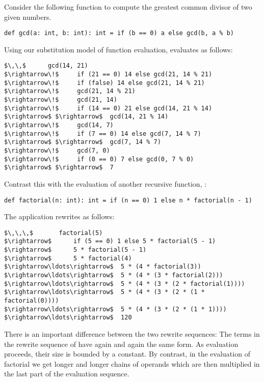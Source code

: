 Consider the following function to compute the greatest common divisor
of two given numbers.

\begin{lstlisting}
def gcd(a: int, b: int): int = if (b == 0) a else gcd(b, a % b)
\end{lstlisting}

Using our substitution model of function evaluation, 
 evaluates as follows:

\begin{lstlisting}
$\,\,$      gcd(14, 21)  
$\rightarrow\!$     if (21 == 0) 14 else gcd(21, 14 % 21)
$\rightarrow\!$     if (false) 14 else gcd(21, 14 % 21)
$\rightarrow\!$     gcd(21, 14 % 21)
$\rightarrow\!$     gcd(21, 14)
$\rightarrow\!$     if (14 == 0) 21 else gcd(14, 21 % 14)
$\rightarrow$ $\rightarrow$  gcd(14, 21 % 14)
$\rightarrow\!$     gcd(14, 7)
$\rightarrow\!$     if (7 == 0) 14 else gcd(7, 14 % 7)
$\rightarrow$ $\rightarrow$  gcd(7, 14 % 7)
$\rightarrow\!$     gcd(7, 0)
$\rightarrow\!$     if (0 == 0) 7 else gcd(0, 7 % 0)
$\rightarrow$ $\rightarrow$  7
\end{lstlisting}

Contrast this with the evaluation of another recursive function, 
:

\begin{lstlisting}
def factorial(n: int): int = if (n == 0) 1 else n * factorial(n - 1)
\end{lstlisting}

The application  rewrites as follows:
\begin{lstlisting}
$\,\,\,$       factorial(5)
$\rightarrow$      if (5 == 0) 1 else 5 * factorial(5 - 1)
$\rightarrow$      5 * factorial(5 - 1)
$\rightarrow$      5 * factorial(4)
$\rightarrow\ldots\rightarrow$  5 * (4 * factorial(3))
$\rightarrow\ldots\rightarrow$  5 * (4 * (3 * factorial(2)))
$\rightarrow\ldots\rightarrow$  5 * (4 * (3 * (2 * factorial(1))))
$\rightarrow\ldots\rightarrow$  5 * (4 * (3 * (2 * (1 * factorial(0))))
$\rightarrow\ldots\rightarrow$  5 * (4 * (3 * (2 * (1 * 1))))
$\rightarrow\ldots\rightarrow$  120
\end{lstlisting}
There is an important difference between the two rewrite sequences:
The terms in the rewrite sequence of  have again and again
the same form. As evaluation proceeds, their size is bounded by a
constant. By contrast, in the evaluation of factorial we get longer
and longer chains of operands which are then multiplied in the last
part of the evaluation sequence.

